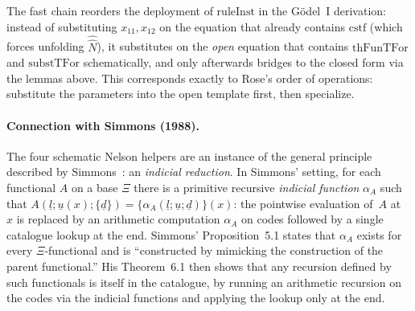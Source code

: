 \documentclass[11pt]{article}
\newcommand{\reify}[1]{\widehat{#1}}
\newcommand{\thFunTFor}{\mathrm{thFunTFor}}
\newcommand{\cstf}{\mathrm{cstf}}
\begin{document}
The fast chain reorders the deployment of $\mathrm{ruleInst}$
in the G\"odel~I derivation: instead of substituting
$x_{11}, x_{12}$ on the equation that already contains
$\cstf$ (which forces unfolding $\reify{\hat{N}}$), it
substitutes on the \emph{open} equation that contains
$\thFunTFor$ and $\mathrm{substTFor}$ schematically, and only
afterwards bridges to the closed form via the lemmas above.
This corresponds exactly to Rose's order of operations:
substitute the parameters into the open template first, then
specialize.

\paragraph{Connection with Simmons (1988).}
The four schematic Nelson helpers are an instance of the general
principle described by Simmons~\cite{simmons1988}: an
\emph{indicial reduction}.  In Simmons' setting, for each functional
$A$ on a base $\Xi$ there is a primitive recursive
\emph{indicial function} $\alpha_A$ such that
$A(\underline{l};\underline{u}(x);\{\underline{d}\})
 = \{\alpha_A(\underline{l};\underline{u};\underline{d})\}(x)$:
the pointwise evaluation of~$A$ at~$x$ is replaced by an
arithmetic computation $\alpha_A$ on codes followed by a single
catalogue lookup at the end.  Simmons' Proposition~5.1 states
that $\alpha_A$ exists for every $\Xi$-functional and is
``constructed by mimicking the construction of the parent
functional.''  His Theorem~6.1 then shows that any recursion
defined by such functionals is itself in the catalogue, by
running an arithmetic recursion on the codes via the indicial
functions and applying the lookup only at the end.
\end{document}
